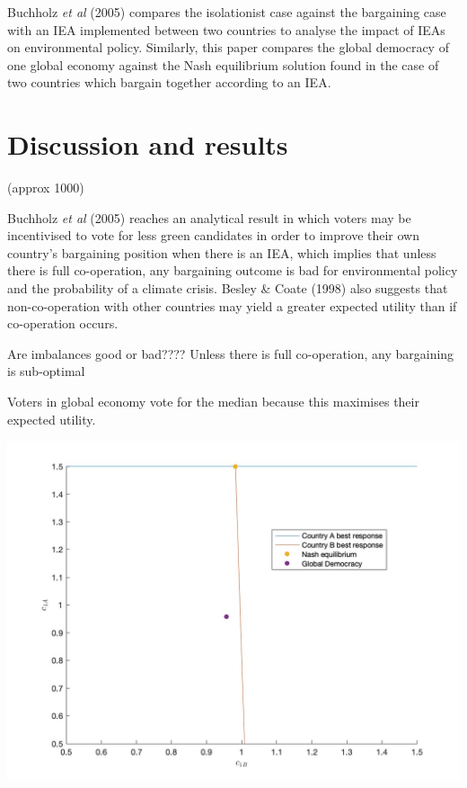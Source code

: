 \documentclass[11pt,preprint, authoryear]{elsarticle}
\let\origfigure\figure
\let\endorigfigure\endfigure
\renewenvironment{figure}[1][2] {
    \expandafter\origfigure\expandafter[H]
} {
    \endorigfigure
}
\numberwithin{equation}{section}
\numberwithin{figure}{section}
\numberwithin{table}{section}
\begin{document}
Buchholz \emph{et al} (2005) compares the isolationist case against the
bargaining case with an IEA implemented between two countries to analyse
the impact of IEAs on environmental policy. Similarly, this paper
compares the global democracy of one global economy against the Nash
equilibrium solution found in the case of two countries which bargain
together according to an IEA.

\hypertarget{discussion-and-results}{%
\section{Discussion and results}\label{discussion-and-results}}

(approx 1000)

Buchholz \emph{et al} (2005) reaches an analytical result in which
voters may be incentivised to vote for less green candidates in order to
improve their own country's bargaining position when there is an IEA,
which implies that unless there is full co-operation, any bargaining
outcome is bad for environmental policy and the probability of a climate
crisis. Besley \& Coate (1998) also suggests that non-co-operation with
other countries may yield a greater expected utility than if
co-operation occurs.

Are imbalances good or bad???? Unless there is full co-operation, any
bargaining is sub-optimal

Voters in global economy vote for the median because this maximises
their expected utility.

\newpage

\begin{figure}[H]

{\centering \includegraphics[width=0.45\linewidth]{images/Fig2_0.1Size0Bias} 

}

\caption{Nash equilibrium for 0.1 country A share}\label{fig:unnamed-chunk-2}
\end{figure}
\end{document}
